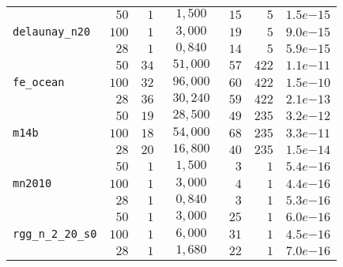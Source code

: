 \begin{tabular}{l|c|c|c|c|c|c}
 & $\phantom{0}50$ & $\phantom{0}1$ & $\phantom{0}1,500$ & $\phantom{0}15$ & $\phantom{00}5$ & $1.5e{-15}$ \\
\verb|delaunay_n20| & $100$ & $\phantom{0}1$ & $\phantom{0}3,000$ & $\phantom{0}19$ & $\phantom{00}5$ & $9.0e{-15}$ \\
 & $\phantom{0}28$ & $\phantom{0}1$ & $\phantom{0}0,840$ & $\phantom{0}14$ & $\phantom{00}5$ & $5.9e{-15}$ \\\hline
 & $\phantom{0}50$ & $34$ & $\phantom{0}51,000$ & $\phantom{0}57$ & $422$ & $1.1e{-11}$ \\
\verb|fe_ocean| & $100$ & $32$ & $\phantom{0}96,000$ & $\phantom{0}60$ & $422$ & $1.5e{-10}$ \\
 & $\phantom{0}28$ & $36$ & $\phantom{0}30,240$ & $\phantom{0}59$ & $422$ & $2.1e{-13}$ \\\hline
 & $\phantom{0}50$ & $19$ & $\phantom{0}28,500$ & $\phantom{0}49$ & $235$ & $3.2e{-12}$ \\
\verb|m14b| & $100$ & $18$ & $\phantom{0}54,000$ & $\phantom{0}68$ & $235$ & $3.3e{-11}$ \\
 & $\phantom{0}28$ & $20$ & $\phantom{0}16,800$ & $\phantom{0}40$ & $235$ & $1.5e{-14}$ \\\hline
 & $\phantom{0}50$ & $\phantom{0}1$ & $\phantom{0}1,500$ & $\phantom{00}3$ & $\phantom{00}1$ & $5.4e{-16}$ \\
\verb|mn2010| & $100$ & $\phantom{0}1$ & $\phantom{0}3,000$ & $\phantom{00}4$ & $\phantom{00}1$ & $4.4e{-16}$ \\
 & $\phantom{0}28$ & $\phantom{0}1$ & $\phantom{0}0,840$ & $\phantom{00}3$ & $\phantom{00}1$ & $5.3e{-16}$ \\\hline
 & $\phantom{0}50$ & $\phantom{0}1$ & $\phantom{0}3,000$ & $\phantom{0}25$ & $\phantom{00}1$ & $6.0e{-16}$ \\
\verb|rgg_n_2_20_s0| & $100$ & $\phantom{0}1$ & $\phantom{0}6,000$ & $\phantom{0}31$ & $\phantom{00}1$ & $4.5e{-16}$ \\
 & $\phantom{0}28$ & $\phantom{0}1$ & $\phantom{0}1,680$ & $\phantom{0}22$ & $\phantom{00}1$ & $7.0e{-16}$ \\\hline
\end{tabular}
